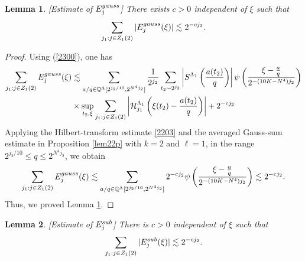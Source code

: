 \documentclass[10pt,a4paper]{amsart}
\newtheorem{lemma}{Lemma}\numberwithin{lemma}{section}
\numberwithin{equation}{section}
\begin{document}
 \begin{lemma}\label{lem850}[Estimate of $E_j^{\rm{gauss}}$]
  There exists $c>0$ independent of $\xi$ such that 
$$\sum_{j_1:j\in Z_1(2)} |E^{\rm{gauss}}_j(\xi)|\lesssim 2^{-cj_2}.$$
\end{lemma}
\begin{proof}
Using (\ref{2300}),  one has
  \begin{align*}
\sum_{j_1:j\in Z_1(2)} E^{\rm{gauss}}_j(\xi)
&\lesssim \sum_{a/q\in  \mathbb{Q}^{\Lambda}[2^{j_2/10},2^{N^4j_2}]} \frac{1}{2^{j_2}}\sum_{t_2\sim 2^{j_2}}\left|S^{\Lambda_1}\left( \frac{a(t_2)}{q} \right)\right|\psi\left(\frac{\xi-\frac{a}{q}}{2^{-(10K-N^4)j_2}}\right) \\
 &\times\sup_{t_2,\xi} \sum_{j_1:j\in Z_1(2)}\left|\mathcal{H}^{\Lambda_1}_{j_1}\left( \xi(t_2)-\frac{a(t_2)}{q}  \right)\right| +2^{-cj_2}
 \end{align*}
Applying the Hilbert-transform estimate \eqref{2203} and 
 the averaged Gauss-sum estimate in Proposition \ref{lem22p} with $k=2$ and $\ell=1$, in the range $  2^{j_2/10}\le q\le 2^{N^4j_2}$, we obtain
$$
 \sum_{j_1:j\in Z_1(2)} E^{\rm{gauss}}_j(\xi)\lesssim \sum_{a/q\in  \mathbb{Q}^{\Lambda}[2^{j_2/10},2^{N^4j_2}]}2^{-cj_2} \psi\left(\frac{\xi-\frac{a}{q}}{2^{-(10K-N^4)j_2}}\right)  \lesssim 2^{-cj_2}.
$$
Thus, we proved Lemma \ref{lem850}.
\end{proof} 



\begin{lemma}\label{lem57}[Estimate of $E_j^{\rm{sub}}$]\label{lem36}  There is $c>0$  independent of $\xi$ such that 
$$\sum_{j_1:j\in Z_1(2)} |E^{\rm{sub}}_j(\xi)| \lesssim 2^{-cj_2}.$$
\end{lemma}
\end{document}
